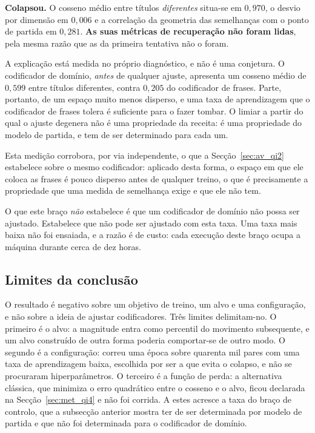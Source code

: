 \textbf{Colapsou.} O cosseno médio entre títulos \emph{diferentes} situa-se em $0{,}970$, o desvio
por dimensão em $0{,}006$ e a correlação da geometria das semelhanças com o ponto de partida em
$0{,}281$. \textbf{As suas métricas de recuperação não foram lidas}, pela mesma razão que as da
primeira tentativa não o foram.

A explicação está medida no próprio diagnóstico, e não é uma conjetura. O codificador de domínio,
\emph{antes} de qualquer ajuste, apresenta um cosseno médio de $0{,}599$ entre títulos diferentes,
contra $0{,}205$ do codificador de frases. Parte, portanto, de um espaço muito menos disperso, e
uma taxa de aprendizagem que o codificador de frases tolera é suficiente para o fazer tombar. O
limiar a partir do qual o ajuste degenera não é uma propriedade da receita: é uma propriedade do
modelo de partida, e tem de ser determinado para cada um.

Esta medição corrobora, por via independente, o que a Secção~\ref{sec:av_qi2} estabelece sobre o
mesmo codificador: aplicado desta forma, o espaço em que ele coloca as frases é pouco disperso
antes de qualquer treino, o que é precisamente a propriedade que uma medida de semelhança exige e
que ele não tem.

O que este braço \emph{não} estabelece é que um codificador de domínio não possa ser ajustado.
Estabelece que não pode ser ajustado com esta taxa. Uma taxa mais baixa não foi ensaiada, e a
razão é de custo: cada execução deste braço ocupa a máquina durante cerca de dez horas.

\subsection{Limites da conclusão}

O resultado é negativo sobre um objetivo de treino, um alvo e uma configuração, e não sobre a
ideia de ajustar codificadores. Três limites delimitam-no. O primeiro é o alvo: a magnitude entra
como percentil do movimento subsequente, e um alvo construído de outra forma poderia comportar-se
de outro modo. O segundo é a configuração: correu uma época sobre quarenta mil pares com uma taxa
de aprendizagem baixa, escolhida por ser a que evita o colapso, e não se procuraram
hiperparâmetros. O terceiro é a função de perda: a alternativa clássica, que minimiza o erro
quadrático entre o cosseno e o alvo, ficou declarada na Secção~\ref{sec:met_qi4} e não foi
corrida. A estes acresce a taxa do braço de controlo, que a subsecção anterior mostra ter de
ser determinada por modelo de partida e que não foi determinada para o codificador de
domínio.

